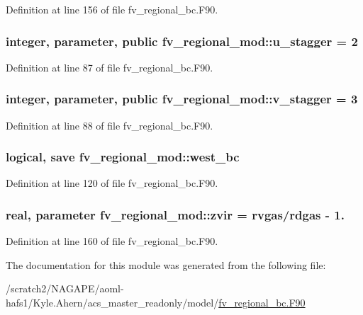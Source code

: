 Definition at line 156 of file fv\-\_\-regional\-\_\-bc.\-F90.

\subsubsection[{u\-\_\-stagger}]{\setlength{\rightskip}{0pt plus 5cm}integer, parameter, public fv\-\_\-regional\-\_\-mod\-::u\-\_\-stagger = 2}\label{classfv__regional__mod_a6066b6d442bf60820ed3124997c2de88}


Definition at line 87 of file fv\-\_\-regional\-\_\-bc.\-F90.

\subsubsection[{v\-\_\-stagger}]{\setlength{\rightskip}{0pt plus 5cm}integer, parameter, public fv\-\_\-regional\-\_\-mod\-::v\-\_\-stagger = 3}\label{classfv__regional__mod_a279442c8a15e38c2db6957829cd5d594}


Definition at line 88 of file fv\-\_\-regional\-\_\-bc.\-F90.

\subsubsection[{west\-\_\-bc}]{\setlength{\rightskip}{0pt plus 5cm}logical, save fv\-\_\-regional\-\_\-mod\-::west\-\_\-bc\hspace{0.3cm}{\ttfamily [private]}}\label{classfv__regional__mod_acb6bcb04c44ff52d6d5caa07da7952d2}


Definition at line 120 of file fv\-\_\-regional\-\_\-bc.\-F90.

\subsubsection[{zvir}]{\setlength{\rightskip}{0pt plus 5cm}real, parameter fv\-\_\-regional\-\_\-mod\-::zvir = rvgas/rdgas -\/ 1.\hspace{0.3cm}{\ttfamily [private]}}\label{classfv__regional__mod_a8ac5940c29c15b1a91d7ee8e80e826bc}


Definition at line 160 of file fv\-\_\-regional\-\_\-bc.\-F90.



The documentation for this module was generated from the following file\-:\begin{DoxyCompactItemize}
\item 
/scratch2/\-N\-A\-G\-A\-P\-E/aoml-\/hafs1/\-Kyle.\-Ahern/acs\-\_\-master\-\_\-readonly/model/\hyperlink{fv__regional__bc_8F90}{fv\-\_\-regional\-\_\-bc.\-F90}\end{DoxyCompactItemize}
